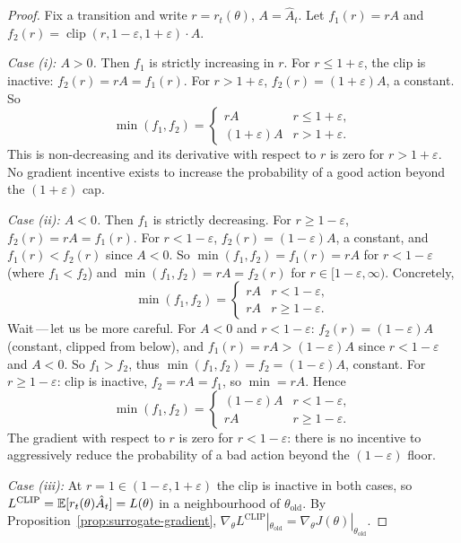 \begin{proof}
Fix a transition and write $r = r_t(\theta)$, $A = \hat{A}_t$.
Let $f_1(r) = r A$ and $f_2(r) = \operatorname{clip}(r, 1-\varepsilon, 1+\varepsilon)\cdot A$.

\medskip
\textit{Case (i): $A > 0$.}
Then $f_1$ is strictly increasing in $r$.  For $r \leq 1+\varepsilon$,
the clip is inactive: $f_2(r) = rA = f_1(r)$.  For $r > 1+\varepsilon$,
$f_2(r) = (1+\varepsilon)A$, a constant.  So
\[
\min(f_1, f_2)
= \begin{cases} rA & r \leq 1+\varepsilon, \\ (1+\varepsilon)A & r > 1+\varepsilon.\end{cases}
\]
This is non-decreasing and its derivative with respect to $r$ is zero for
$r > 1+\varepsilon$.  No gradient incentive exists to increase the
probability of a good action beyond the $(1+\varepsilon)$ cap.

\medskip
\textit{Case (ii): $A < 0$.}
Then $f_1$ is strictly decreasing.  For $r \geq 1-\varepsilon$, $f_2(r) = rA = f_1(r)$.
For $r < 1-\varepsilon$, $f_2(r) = (1-\varepsilon)A$, a constant, and
$f_1(r) < f_2(r)$ since $A < 0$.  So $\min(f_1, f_2) = f_1(r) = rA$ for
$r < 1-\varepsilon$ (where $f_1 < f_2$) and $\min(f_1,f_2) = rA = f_2(r)$
for $r \in [1-\varepsilon, \infty)$.  Concretely,
\[
\min(f_1, f_2)
= \begin{cases} rA & r < 1-\varepsilon, \\ rA & r \geq 1-\varepsilon. \end{cases}
\]
Wait\,---\,let us be more careful.  For $A < 0$ and $r < 1-\varepsilon$:
$f_2(r) = (1-\varepsilon)A$ (constant, clipped from below), and
$f_1(r) = rA > (1-\varepsilon)A$ since $r < 1-\varepsilon$ and $A<0$.
So $f_1 > f_2$, thus $\min(f_1,f_2) = f_2 = (1-\varepsilon)A$, constant.
For $r \geq 1-\varepsilon$: clip is inactive, $f_2 = rA = f_1$,
so $\min = rA$.  Hence
\[
\min(f_1, f_2)
= \begin{cases} (1-\varepsilon)A & r < 1-\varepsilon, \\ rA & r \geq 1-\varepsilon.\end{cases}
\]
The gradient with respect to $r$ is zero for $r < 1-\varepsilon$:
there is no incentive to aggressively reduce the probability of a bad action
beyond the $(1-\varepsilon)$ floor.

\medskip
\textit{Case (iii):} At $r = 1 \in (1-\varepsilon, 1+\varepsilon)$ the clip
is inactive in both cases, so $L^{\mathrm{CLIP}} = \operatorname{\mathbb{E}}[r_t(\theta)\hat{A}_t]
= L(\theta)$ in a neighbourhood of $\theta_\mathrm{old}$.
By Proposition~\ref{prop:surrogate-gradient}, $\nabla_\theta L^{\mathrm{CLIP}}
|_{\theta_\mathrm{old}} = \nabla_\theta J(\theta)|_{\theta_\mathrm{old}}$.
\end{proof}

